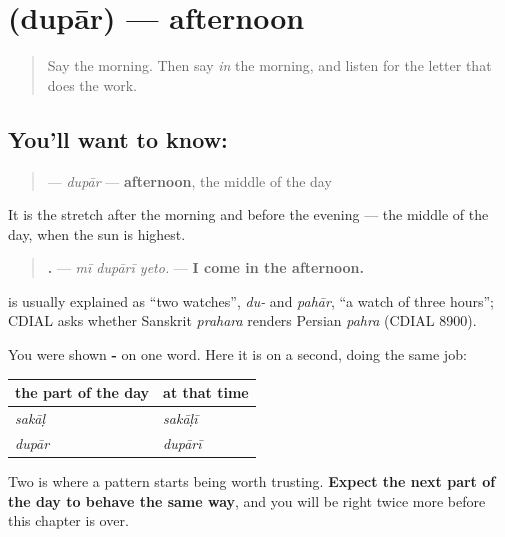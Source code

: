 \section[\texorpdfstring{\mr{दुपार} (dupār)}{दुपार (dupār)}]{ (dupār) — afternoon}

\label{lesson:MR-C66-dupar}



\begin{quote}
Say the morning. Then say \emph{in} the morning, and listen for the letter that does the work.
\end{quote}

\subsection*{You'll want to know: }
\begin{quote}
\textbf{} — \emph{dupār} — \textbf{afternoon}, the middle of the day
\end{quote}

It is the stretch after the morning and before the evening — the middle of the day, when the sun is highest.

\begin{quote}
\textbf{  .} — \emph{mī dupārī yeto.} — \textbf{I come in the afternoon.}
\end{quote}

\begin{cousinweb}
\textbf{} is usually explained as \textquotedblleft{}two watches\textquotedblright{}, \emph{du-} and \emph{pahār}, \textquotedblleft{}a watch of three hours\textquotedblright{}; CDIAL asks whether Sanskrit \emph{prahara} renders Persian \emph{pahra} (CDIAL 8900).
\end{cousinweb}

\begin{grammarlens}[title={Grammar Lens: the ending holds}]
You were shown \textbf{-} on one word. Here it is on a second, doing the same job:

\noindent
\begin{tabularx}{\linewidth}{@{}>{\raggedright\arraybackslash}X>{\raggedright\arraybackslash}X@{}}
\toprule
\textbf{the part of the day} & \textbf{at that time} \\
\midrule
\textbf{\mr{सकाळ}} \emph{sakāḷ} & \textbf{\mr{सकाळी}} \emph{sakāḷī} \\
\textbf{\mr{दुपार}} \emph{dupār} & \textbf{\mr{दुपारी}} \emph{dupārī} \\
\bottomrule
\end{tabularx}

Two is where a pattern starts being worth trusting. \textbf{Expect the next part of the day to behave the same way}, and you will be right twice more before this chapter is over.
\end{grammarlens}

